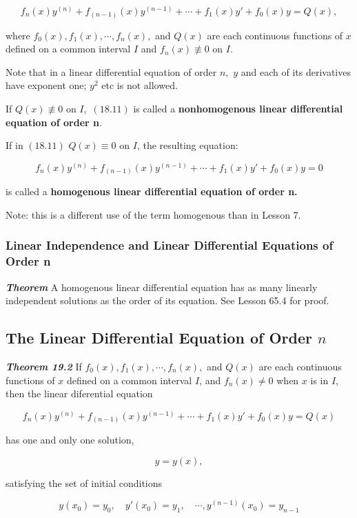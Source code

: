 \documentclass{article}
\begin{document}
\[ \tag{18.11} f_n(x)y^{(n)} + f_{(n-1)}(x)y^{(n-1)} + \cdots + f_1(x)y' + f_0(x)y = Q(x), \]

where $f_0(x),f_1(x),\cdots,f_n(x),$ and $Q(x)$ are each \@{continuous} functions of $x$ defined on a common interval $I$ and $f_n(x) \not\equiv 0$ on $I$.

Note that in a linear differential equation of order $n,$ $y$ and each of its derivatives have exponent one; $y^2$ etc is not allowed.

If $Q(x) \not\equiv 0$ on $I,$ $(18.11)$ is called a \textbf{nonhomogenous linear differential equation of order n}.

If in $(18.11)$ $Q(x) \equiv 0$ on $I$, the resulting equation:

\[ \tag{18.13} f_n(x)y^{(n)} + f_{(n-1)}(x)y^{(n-1)} + \cdots + f_1(x)y' + f_0(x)y = 0 \]

is called a \textbf{homogenous linear differential equation of order n.}

Note: this is a different use of the term homogenous than in Lesson 7.

\subsubsection{Linear Independence and Linear Differential Equations of Order n}

\emph{\textbf{Theorem}} A homogenous linear differential equation has as many linearly independent solutions as the order of its equation. See Lesson 65.4 for proof.

\subsection{The Linear Differential Equation of Order $n$}

\emph{\textbf{Theorem 19.2}} If $f_0(x),f_1(x),\cdots,f_n(x),$ and $Q(x)$ are each \@{continuous} functions of $x$ defined on a common interval $I$, and $f_n(x) \neq 0$ when $x$ is in $I$, then the linear diferential equation

\[ \tag{19.21} f_n(x)y^{(n)} + f_{(n-1)}(x)y^{(n-1)} + \cdots + f_1(x)y' + f_0(x)y = Q(x) \]

has one and only one solution,

\[ \tag{19.22} y = y(x), \]

satisfying the set of initial conditions

\[ \tag{19.23} y(x_0) = y_0,\quad y'(x_0) = y_1, \quad \cdots, y^{(n-1)}(x_0) = y_{n-1} \]
\end{document}
